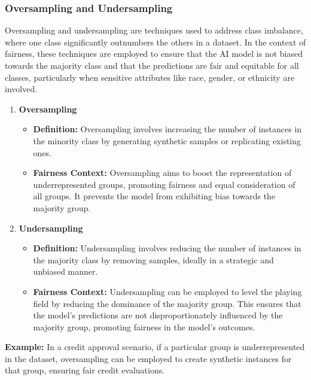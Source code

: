 \documentclass[12pt,a4paper,openright,twoside]{book}
\begin{document}
\subsubsection{Oversampling and Undersampling}
Oversampling and undersampling are techniques used to address class imbalance, where one class significantly outnumbers the others in a dataset. In the context of fairness, these techniques are employed to ensure that the AI model is not biased towards the majority class and that the predictions are fair and equitable for all classes, particularly when sensitive attributes like race, gender, or ethnicity are involved. \cite{9442706}
\begin{enumerate}
    \item \textbf{Oversampling}

    \begin{itemize}
        \item \textbf{Definition:} Oversampling involves increasing the number of instances in the minority class by generating synthetic samples or replicating existing ones.
        \item \textbf{Fairness Context:} Oversampling aims to boost the representation of underrepresented groups, promoting fairness and equal consideration of all groups. It prevents the model from exhibiting bias towards the majority group.
    \end{itemize}

    \item \textbf{Undersampling}

    \begin{itemize}
        \item \textbf{Definition:} Undersampling involves reducing the number of instances in the majority class by removing samples, ideally in a strategic and unbiased manner.
        \item \textbf{Fairness Context:} Undersampling can be employed to level the playing field by reducing the dominance of the majority group. This ensures that the model's predictions are not disproportionately influenced by the majority group, promoting fairness in the model's outcomes.
    \end{itemize}

\end{enumerate}

\textbf{Example:} In a credit approval scenario, if a particular group is underrepresented in the dataset, oversampling can be employed to create synthetic instances for that group, ensuring fair credit evaluations.
\end{document}
